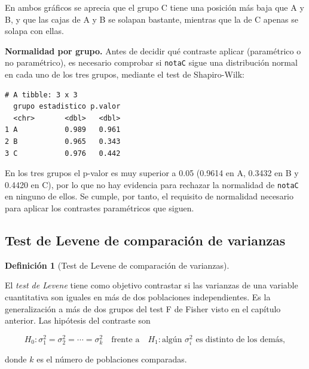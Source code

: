 \documentclass[
  spanish,
  a4paper,
]{scrreport}
\newenvironment{Shaded}{\begin{snugshade}}{\end{snugshade}}
\newcommand{\AttributeTok}[1]{\textcolor[rgb]{0.40,0.45,0.13}{#1}}
\newcommand{\FunctionTok}[1]{\textcolor[rgb]{0.28,0.35,0.67}{#1}}
\newcommand{\NormalTok}[1]{\textcolor[rgb]{0.00,0.23,0.31}{#1}}
\newcommand{\SpecialCharTok}[1]{\textcolor[rgb]{0.37,0.37,0.37}{#1}}
\theoremstyle{definition}
\theoremstyle{definition}
\newtheorem{definition}{Definición}[chapter]
\theoremstyle{remark}
\begin{document}
En ambos gráficos se aprecia que el grupo C tiene una posición más baja
que A y B, y que las cajas de A y B se solapan bastante, mientras que la
de C apenas se solapa con ellas.

\textbf{Normalidad por grupo.} Antes de decidir qué contraste aplicar
(paramétrico o no paramétrico), es necesario comprobar si \texttt{notaC}
sigue una distribución normal en cada uno de los tres grupos, mediante
el test de Shapiro-Wilk:

\begin{Shaded}
\end{Shaded}

\begin{verbatim}
# A tibble: 3 x 3
  grupo estadistico p.valor
  <chr>       <dbl>   <dbl>
1 A           0.989   0.961
2 B           0.965   0.343
3 C           0.976   0.442
\end{verbatim}

En los tres grupos el p-valor es muy superior a 0.05 (0.9614 en A,
0.3432 en B y 0.4420 en C), por lo que no hay evidencia para rechazar la
normalidad de \texttt{notaC} en ninguno de ellos. Se cumple, por tanto,
el requisito de normalidad necesario para aplicar los contrastes
paramétricos que siguen.

\subsection{Test de Levene de comparación de
varianzas}\label{test-de-levene-de-comparaciuxf3n-de-varianzas}

\begin{definition}[Test de Levene de comparación de
varianzas]\protect\hypertarget{def-masdosindep-levene}{}\label{def-masdosindep-levene}

El \emph{test de Levene} tiene como objetivo contrastar si las varianzas
de una variable cuantitativa son iguales en más de dos poblaciones
independientes. Es la generalización a más de dos grupos del test F de
Fisher visto en el capítulo anterior. Las hipótesis del contraste son

\[H_0: \sigma_1^2=\sigma_2^2=\cdots=\sigma_k^2 \quad \text{frente a} \quad H_1: \text{algún } \sigma_i^2 \text{ es distinto de los demás},\]

donde \(k\) es el número de poblaciones comparadas.

\end{definition}
\end{document}
